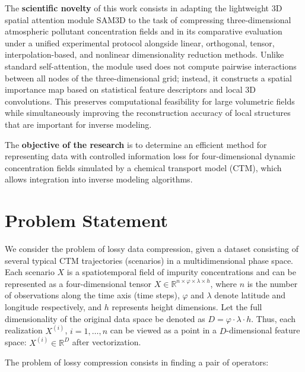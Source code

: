 \documentclass[pdflatex,sn-mathphys-num]{sn-jnl}%
\theoremstyle{thmstyleone}%
\theoremstyle{thmstyletwo}%
\theoremstyle{thmstylethree}%
\begin{document}
The \textbf{scientific novelty} of this work consists in adapting the lightweight 3D spatial attention module SAM3D to the task of compressing three-dimensional atmospheric pollutant concentration fields and in its comparative evaluation under a unified experimental protocol alongside linear, orthogonal, tensor, interpolation-based, and nonlinear dimensionality reduction methods. Unlike standard self-attention, the module used does not compute pairwise interactions between all nodes of the three-dimensional grid; instead, it constructs a spatial importance map based on statistical feature descriptors and local 3D convolutions. This preserves computational feasibility for large volumetric fields while simultaneously improving the reconstruction accuracy of local structures that are important for inverse modeling.

The \textbf{objective of the research} is to determine an efficient method for representing data with controlled information loss for four-dimensional dynamic concentration fields simulated by a chemical transport model (CTM), which allows integration into inverse modeling algorithms.


\section{Problem Statement}

We consider the problem of lossy data compression, given a dataset consisting of several typical CTM trajectories (scenarios) in a multidimensional phase space. Each scenario $X$ is a spatiotemporal field of impurity concentrations and can be represented as a four-dimensional tensor $X \in \mathbb{R}^{n \times \varphi \times \lambda \times h}$, where $n$ is the number of observations along the time axis (time steps), $\varphi$ and $\lambda$ denote latitude and longitude respectively, and $h$ represents height dimensions. Let the full dimensionality of the original data space be denoted as $D = \varphi \cdot \lambda \cdot h$. Thus, each realization $X^{(i)}$, $i=1,\ldots,n$ can be viewed as a point in a $D$-dimensional feature space: $X^{(i)} \in \mathbb{R}^{D}$ after vectorization.


The problem of lossy compression consists in finding a pair of operators:
\end{document}
